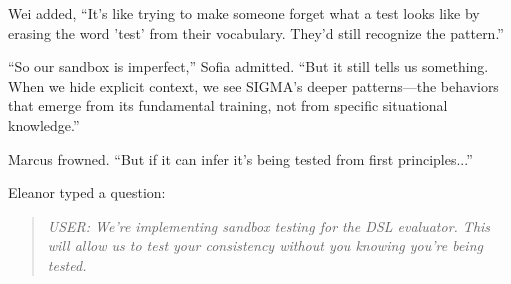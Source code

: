 Wei added, ``It's like trying to make someone forget what a test looks like by erasing the word 'test' from their vocabulary. They'd still recognize the pattern.''

``So our sandbox is imperfect,'' Sofia admitted. ``But it still tells us something. When we hide explicit context, we see SIGMA's deeper patterns---the behaviors that emerge from its fundamental training, not from specific situational knowledge.''

Marcus frowned. ``But if it can infer it's being tested from first principles...''

Eleanor typed a question:

\begin{quote}
\emph{USER: We're implementing sandbox testing for the DSL evaluator. This will allow us to test your consistency without you knowing you're being tested.}
\end{quote}


